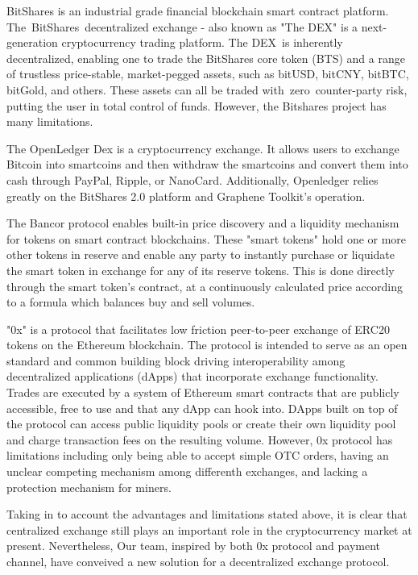 \documentclass[UTF8,nofonts]{article}
\begin{document}
BitShares\cite{schuhbitshares}\cite{schuh2015bitshares} is an industrial grade financial blockchain smart contract platform. The BitShares decentralized exchange - also known as "The DEX" is a next-generation cryptocurrency trading platform. The DEX is inherently decentralized, enabling one to trade the BitShares core token (BTS) and a range of trustless price-stable, market-pegged assets, such as bitUSD, bitCNY, bitBTC, bitGold, and others. These assets can all be traded with zero counter-party risk, putting the user in total control of funds. However, the Bitshares project has many limitations.

The OpenLedger Dex\cite{openledger} is a cryptocurrency exchange. It allows users to exchange Bitcoin into smartcoins and then withdraw the smartcoins and convert them into cash through PayPal, Ripple, or NanoCard. Additionally, Openledger relies greatly on the BitShares 2.0 platform and Graphene Toolkit's operation.

The Bancor\cite{bancor}\cite{hanson2012logarithmic} protocol enables built-in price discovery and a liquidity mechanism for tokens on smart contract blockchains. These "smart tokens" hold one or more other tokens in reserve and enable any party to instantly purchase or liquidate the smart token in exchange for any of its reserve tokens. This is done directly through the smart token's contract, at a continuously calculated price according to a formula which balances buy and sell volumes.

"0x"\cite{warren20170x} is a protocol that facilitates low friction peer-to-peer exchange of ERC20\cite{ERC20} tokens on the Ethereum blockchain. The protocol is intended to serve as an open standard and common building block driving interoperability among decentralized applications (dApps) that incorporate exchange functionality. Trades are executed by a system of Ethereum smart contracts that are publicly accessible, free to use and that any dApp can hook into. DApps built on top of the protocol can access public liquidity pools or create their own liquidity pool and charge transaction fees on the resulting volume. However, 0x protocol has limitations including  only being able to accept simple OTC orders, having an unclear competing mechanism among differenth exchanges, and lacking a protection mechanism for miners.

Taking in to account the advantages and limitations stated above, it is clear that centralized exchange still plays an important role in the cryptocurrency market at present. Nevertheless, Our team, inspired by both 0x protocol and payment channel, have conveived a new solution for a decentralized exchange protocol.
\end{document}
